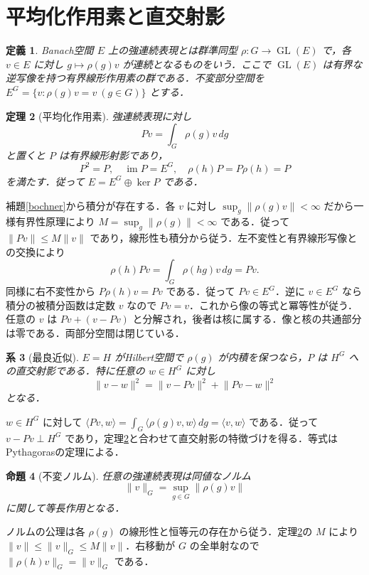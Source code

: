 \documentclass[a5paper,10pt,onecolumn]{jsarticle}
\makeatletter
\theoremstyle{mathnotetheorem}
\newtheorem{theorem}{定理}[section]
\newtheorem{definition}[theorem]{定義}
\newtheorem{proposition}[theorem]{命題}
\newtheorem{corollary}[theorem]{系}
\renewcommand{\proofname}{証明}
\renewenvironment{proof}[1][\proofname]{%
  \par\pushQED{\qed}\normalfont\topsep4\p@\@plus2\p@\relax
  \trivlist\item[\hskip\labelsep\bfseries #1]\ignorespaces
}{\popQED\endtrivlist\@endpefalse}
\newcommand{\norm}[1]{\lVert #1\rVert}
\newcommand{\ip}[2]{\langle #1,#2\rangle}
\makeatother
\begin{document}
\section{平均化作用素と直交射影}
\begin{definition}
Banach空間 $E$ 上の強連続表現とは群準同型 $\rho:G\to\operatorname{GL}(E)$ で，各 $v\in E$ に対し $g\mapsto\rho(g)v$ が連続となるものをいう．ここで $\operatorname{GL}(E)$ は有界な逆写像を持つ有界線形作用素の群である．不変部分空間を $E^G=\{v:\rho(g)v=v\ (g\in G)\}$ とする．
\end{definition}
\begin{theorem}[平均化作用素]\label{proj}
強連続表現に対し
\[
 Pv=\int_G\rho(g)v\,dg
\]
と置くと $P$ は有界線形射影であり，
\[
 P^2=P,\quad \operatorname{im}P=E^G,
 \quad \rho(h)P=P\rho(h)=P
\]
を満たす．従って $E=E^G\oplus\ker P$ である．
\end{theorem}
\begin{proof}
補題\ref{bochner}から積分が存在する．各 $v$ に対し $\sup_g\norm{\rho(g)v}<\infty$ だから一様有界性原理により $M=\sup_g\norm{\rho(g)}<\infty$ である．従って $\norm{Pv}\le M\norm v$ であり，線形性も積分から従う．左不変性と有界線形写像との交換により
\[
 \rho(h)Pv=\int_G\rho(hg)v\,dg=Pv.
\]
同様に右不変性から $P\rho(h)v=Pv$ である．従って $Pv\in E^G$．逆に $v\in E^G$ なら積分の被積分函数は定数 $v$ なので $Pv=v$．これから像の等式と冪等性が従う．任意の $v$ は $Pv+(v-Pv)$ と分解され，後者は核に属する．像と核の共通部分は零である．両部分空間は閉じている．
\end{proof}
\begin{corollary}[最良近似]\label{orth}
$E=H$ がHilbert空間で $\rho(g)$ が内積を保つなら，$P$ は $H^G$ への直交射影である．特に任意の $w\in H^G$ に対し
\[
 \norm{v-w}^2=\norm{v-Pv}^2+\norm{Pv-w}^2
\]
となる．
\end{corollary}
\begin{proof}
$w\in H^G$ に対して $\ip{Pv}{w}=\int_G\ip{\rho(g)v}{w}\,dg=\ip{v}{w}$ である．従って $v-Pv\perp H^G$ であり，定理\ref{proj}と合わせて直交射影の特徴づけを得る．等式はPythagorasの定理による．
\end{proof}
\begin{proposition}[不変ノルム]
任意の強連続表現は同値なノルム
\[
 \norm v_G=\sup_{g\in G}\norm{\rho(g)v}
\]
に関して等長作用となる．
\end{proposition}
\begin{proof}
ノルムの公理は各 $\rho(g)$ の線形性と恒等元の存在から従う．定理\ref{proj}の $M$ により $\norm v\le\norm v_G\le M\norm v$．右移動が $G$ の全単射なので $\norm{\rho(h)v}_G=\norm v_G$ である．
\end{proof}
\end{document}
